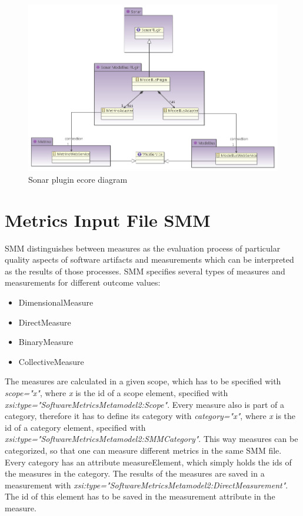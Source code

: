 \begin{figure}[h]
	\centering
		\includegraphics[width=\textwidth]{plugin_ecore_dia}
	\caption{Sonar plugin ecore diagram}
	\label{fig:sonarrunning}
\end{figure}


\section{Metrics Input File SMM}
SMM distinguishes between measures as the evaluation process of
particular quality aspects of software artifacts and measurements
which can be interpreted as the results of those processes. SMM
specifies several types of measures and measurements for different
outcome values:
\begin{itemize}
\item DimensionalMeasure
\item DirectMeasure
\item BinaryMeasure
\item CollectiveMeasure
\end{itemize}

The measures are calculated in a given scope, which has to be
specified with \textit{scope="x"}, where \textit{x} is the id of a
scope element, specified with
\textit{xsi:type="SoftwareMetricsMetamodel2:Scope"}. Every measure
also is part of a category, therefore it has to define its category
with \textit{category="x"}, where \textit{x} is the id of a category
element, specified with
\textit{xsi:type="SoftwareMetricsMetamodel2:SMMCategory"}. This way
measures can be categorized, so that one can measure different metrics
in the same SMM file. Every category has an attribute measureElement,
which simply holds the ids of the measures in the category. The
results of the measures are saved in a measurement with
\textit{xsi:type="SoftwareMetricsMetamodel2:DirectMeasurement"}. The
id of this element has to be saved in the measurement attribute in the
measure.

